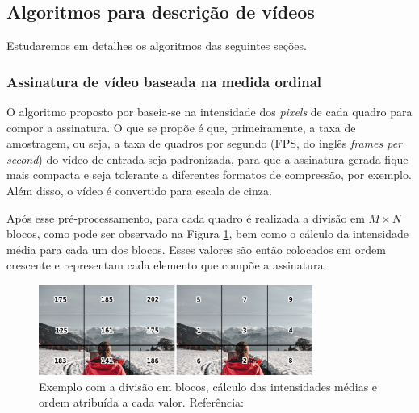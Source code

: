 \subsection{Algoritmos para descrição de vídeos}
Estudaremos em detalhes os algoritmos das seguintes seções.


%
%
\subsubsection{Assinatura de vídeo baseada na medida ordinal}
\label{sec:med_ordinal}

	O algoritmo proposto por \citeauthor{hua2004robust} baseia-se na intensidade dos \textit{pixels} de cada quadro para compor a assinatura. O que se propõe é que, primeiramente, a taxa de amostragem, ou seja, a taxa de quadros por segundo (FPS, do inglês \textit{frames per second}) do vídeo de entrada seja padronizada, para que a assinatura gerada fique mais compacta e seja tolerante a diferentes formatos de compressão, por exemplo. Além disso, o vídeo é convertido para escala de cinza.

Após esse pré-processamento, para cada quadro é realizada a divisão em $M \times N$ blocos, como pode ser observado na Figura \ref{fig:medidaord}, bem como o cálculo da intensidade média para cada um dos blocos. Esses valores são então colocados em ordem crescente e representam cada elemento que compõe a assinatura.

	\begin{figure}[h]
        \centering
        \includegraphics[width=0.8\textwidth]{dados/figuras/mo_final.png}
        \caption{Exemplo com a divisão em blocos, cálculo das intensidades médias e ordem atribuída a cada valor. Referência: \cite{sylvio2015}}
    	\label{fig:medidaord}
    \end{figure}


%
%


